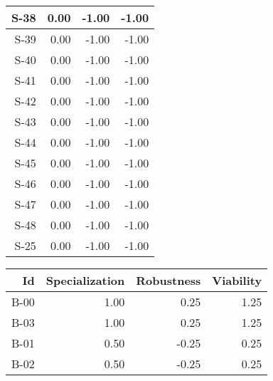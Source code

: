\begin{tabular}{ | r | r | r | r | }
    \hline
                  S-38  &            0.00  &           -1.00  &           -1.00  \\
    \hline
                  S-39  &            0.00  &           -1.00  &           -1.00  \\
    \hline
                  S-40  &            0.00  &           -1.00  &           -1.00  \\
    \hline
                  S-41  &            0.00  &           -1.00  &           -1.00  \\
    \hline
                  S-42  &            0.00  &           -1.00  &           -1.00  \\
    \hline
                  S-43  &            0.00  &           -1.00  &           -1.00  \\
    \hline
                  S-44  &            0.00  &           -1.00  &           -1.00  \\
    \hline
                  S-45  &            0.00  &           -1.00  &           -1.00  \\
    \hline
                  S-46  &            0.00  &           -1.00  &           -1.00  \\
    \hline
                  S-47  &            0.00  &           -1.00  &           -1.00  \\
    \hline
                  S-48  &            0.00  &           -1.00  &           -1.00  \\
    \hline
                  S-25  &            0.00  &           -1.00  &           -1.00  \\
    \hline
\end{tabular}


\begin{tabular}{ | r | r | r | r | }
    \hline
                    Id  &  Specialization  &      Robustness  &       Viability  \\
    \hline
    \hline
                  B-00  &            1.00  &            0.25  &            1.25  \\
    \hline
                  B-03  &            1.00  &            0.25  &            1.25  \\
    \hline
                  B-01  &            0.50  &           -0.25  &            0.25  \\
    \hline
                  B-02  &            0.50  &           -0.25  &            0.25  \\
    \hline
\end{tabular}


